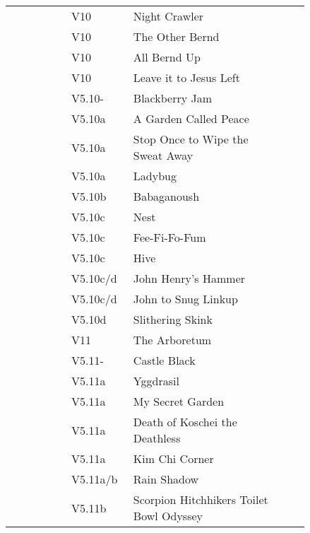 \begin{flushleft}
\begin{center}
\begin{supertabular}{p{0.18\linewidth}p{0.13\linewidth}p{0.45\linewidth}p{0.08\linewidth}}
  &V10&Night Crawler & \pageref{rt:Night Crawler} \\
&V10&The Other Bernd & \pageref{rt:The Other Bernd} \\
&V10&All Bernd Up & \pageref{rt:All Bernd Up} \\
&V10&Leave it to Jesus Left & \pageref{vr:Leave it to Jesus Left} \\
&V5.10-&Blackberry Jam & \pageref{rt:Blackberry Jam} \\
   &V5.10a&A Garden Called Peace & \pageref{rt:A Garden Called Peace} \\
 &V5.10a&Stop Once to Wipe the Sweat Away & \pageref{rt:Stop Once to Wipe the Sweat Away} \\
&V5.10a&Ladybug & \pageref{rt:Ladybug} \\
&V5.10b&Babaganoush & \pageref{rt:Babaganoush} \\
  &V5.10c&Nest & \pageref{rt:Nest} \\
  &V5.10c&Fee-Fi-Fo-Fum & \pageref{rt:Fee-Fi-Fo-Fum} \\
 &V5.10c&Hive & \pageref{rt:Hive} \\
  &V5.10c/d&John Henry's Hammer & \pageref{rt:John Henry's Hammer} \\
  &V5.10c/d&John to Snug Linkup & \pageref{vr:John to Snug Linkup} \\
   &V5.10d&Slithering Skink & \pageref{rt:Slithering Skink} \\
   &V11&The Arboretum & \pageref{rt:The Arboretum} \\
 &V5.11-&Castle Black & \pageref{rt:Castle Black} \\
   &V5.11a&Yggdrasil & \pageref{rt:Yggdrasil} \\
  &V5.11a&My Secret Garden & \pageref{rt:My Secret Garden} \\
 &V5.11a&Death of Koschei the Deathless & \pageref{rt:Death of Koschei the Deathless} \\
&V5.11a&Kim Chi Corner & \pageref{rt:Kim Chi Corner} \\
 &V5.11a/b&Rain Shadow & \pageref{rt:Rain Shadow} \\
   &V5.11b&Scorpion Hitchhikers Toilet Bowl Odyssey & \pageref{rt:Scorpion Hitchhikers Toilet Bowl Odyssey} \\

\end{supertabular}
\end{center}
\end{flushleft}
